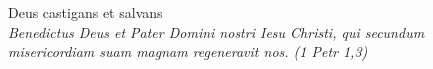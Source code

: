 


\def\greinitialformat#1{%
{\fontsize{39}{39}\selectfont #1}%
}




\vspace{0.3cm}
\begin{center}

Deus castigans et salvans\\
\textit{\small Benedictus Deus et Pater Domini nostri Iesu Christi, qui secundum misericordiam suam magnam regeneravit nos.
(1 Petr 1,3)}
\end{center}
